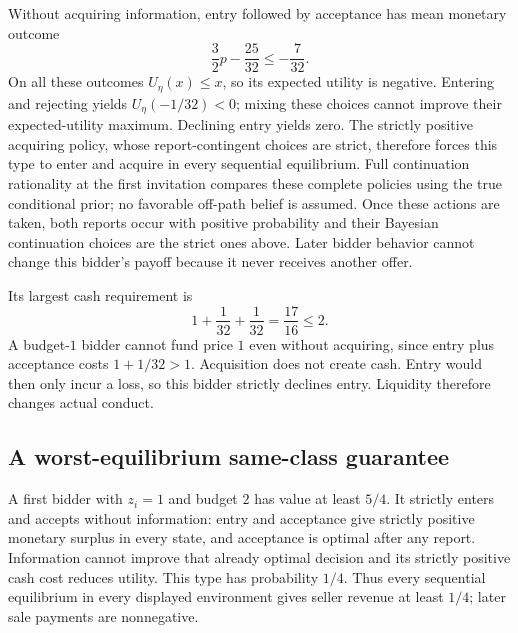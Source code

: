 \documentclass[11pt,a4paper]{article}
\numberwithin{equation}{section}
\theoremstyle{definition}
\begin{document}
Without acquiring information, entry followed by acceptance has mean
monetary outcome
\[
 \frac32p-\frac{25}{32}\le-\frac7{32}.
\]
On all these outcomes \(U_\eta(x)\le x\), so its expected utility is
negative. Entering and rejecting yields \(U_\eta(-1/32)<0\);
mixing these choices cannot improve their expected-utility maximum.
Declining entry yields zero.
The strictly positive acquiring policy, whose report-contingent choices
are strict, therefore forces this type to enter and acquire in every
sequential equilibrium. Full continuation rationality at the first
invitation compares these complete policies using the true conditional
prior; no favorable off-path belief is assumed.
Once these actions are taken, both reports occur with positive probability
and their Bayesian continuation choices are the strict ones above.
Later bidder behavior cannot change this bidder's payoff because it
never receives another offer.

Its largest cash requirement is
\[
 1+\frac1{32}+\frac1{32}=\frac{17}{16}\le2.
\]
A budget-\(1\) bidder cannot fund price \(1\) even without acquiring,
since entry plus acceptance costs \(1+1/32>1\).
Acquisition does not create cash. Entry would then only incur a loss,
so this bidder strictly declines entry.
Liquidity therefore changes actual conduct.

\subsection{A worst-equilibrium same-class guarantee}
A first bidder with \(z_i=1\) and budget \(2\) has value at least
\(5/4\). It strictly enters and accepts without information:
entry and acceptance give strictly positive monetary surplus in
every state, and acceptance is optimal after any report.
Information cannot improve that already optimal decision and its
strictly positive cash cost reduces utility.
This type has probability \(1/4\).
Thus every sequential equilibrium in every displayed environment gives
seller revenue at least \(1/4\); later sale payments are nonnegative.
\end{document}
